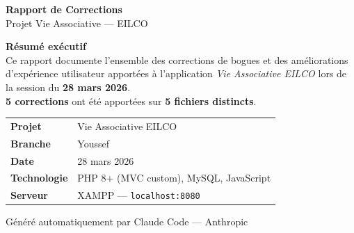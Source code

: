 \documentclass[12pt,a4paper]{article}
\begin{document}
\begin{titlepage}
    \centering
    \vspace*{2cm}

    {\Huge\bfseries\color{primary} Rapport de Corrections}\\[0.5cm]
    {\Large\color{gray} Projet Vie Associative — EILCO}\\[2cm]

    \begin{mdframed}[backgroundcolor=primary!10, linecolor=primary, linewidth=2pt]
        \centering
        \vspace{0.5cm}
        {\large\bfseries Résumé exécutif}\\[0.5cm]
        \normalsize
        Ce rapport documente l'ensemble des corrections de bogues et des
        améliorations d'expérience utilisateur apportées à l'application
        \textit{Vie Associative EILCO} lors de la session du
        \textbf{28 mars 2026}.\\[0.5cm]
        \textbf{5 corrections} ont été apportées sur \textbf{5 fichiers distincts}.
        \vspace{0.3cm}
    \end{mdframed}

    \vspace{2cm}

    \begin{tabular}{ll}
        \textbf{Projet}     & Vie Associative EILCO \\
        \textbf{Branche}    & Youssef \\
        \textbf{Date}       & 28 mars 2026 \\
        \textbf{Technologie} & PHP 8+ (MVC custom), MySQL, JavaScript \\
        \textbf{Serveur}    & XAMPP — \texttt{localhost:8080} \\
    \end{tabular}

    \vfill
    {\small\color{gray} Généré automatiquement par Claude Code — Anthropic}
\end{titlepage}

\tableofcontents
\newpage

\end{document}
